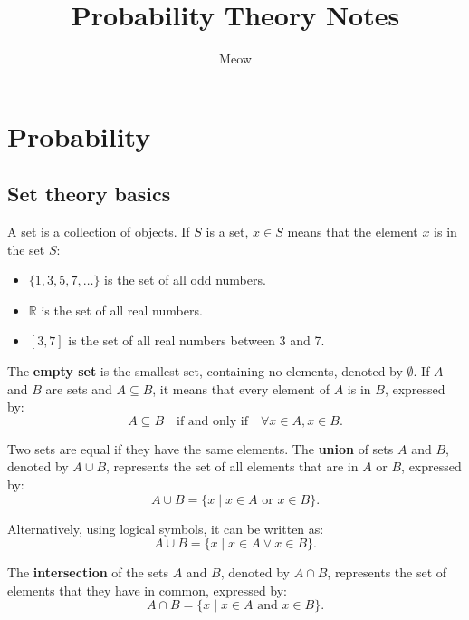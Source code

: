 \documentclass[12pt]{book}
\title{Probability Theory Notes}
\author{Meow}
\theoremstyle{definition}
\begin{document}
\maketitle

\chapter{Probability}
\section{Set theory basics}
A set is a collection of objects. If \(S\) is a set, \(x \in S\) means that the element \(x\) is in the set \(S\):
\begin{itemize}
    \item \(\{1, 3, 5, 7, \dots \}\) is the set of all odd numbers.
    \item \(\mathbb{R}\) is the set of all real numbers.
    \item \([3, 7]\) is the set of all real numbers between 3 and 7.
\end{itemize}

The \textbf{empty set} is the smallest set, containing no elements, denoted by \(\emptyset\).
If \(A\) and \(B\) are sets and \(A \subseteq B\), it means that every element of \(A\) is in \(B\), expressed by:
\begin{equation}
    A \subseteq B \quad \text{if and only if} \quad \forall x \in A, x \in B.
\end{equation}

Two sets are equal if they have the same elements. The \textbf{union} of sets \(A\) and \(B\), denoted by \(A \cup B\), represents the set of all elements that are in \(A\) or \(B\), expressed by:
\begin{equation}
    A \cup B = \{ x \mid x \in A \text{ or } x \in B \}.
\end{equation}

Alternatively, using logical symbols, it can be written as:
\begin{equation}
    A \cup B = \{ x \mid x \in A \lor x \in B \}.
\end{equation}

The \textbf{intersection} of the sets \(A\) and \(B\), denoted by \(A \cap B\), represents the set of elements that they have in common, expressed by:
\begin{equation}
    A \cap B = \{ x \mid x \in A \text{ and } x \in B \}.
\end{equation}
\end{document}
